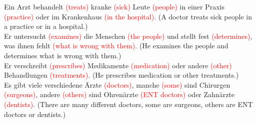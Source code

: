 \documentclass{article}
\begin{document}
\begin{enumerate}
    Ein Arzt behandelt \textcolor{red}{(treats)} kranke \textcolor{red}{(sick)} Leute \textcolor{red}{(people)} in einer Praxis \textcolor{red}{(practice)} oder im Krankenhaus \textcolor{red}{(in the hospital)}. (A doctor treats sick people in a practice or in a hospital.) \\
    Er untersucht \textcolor{red}{(examines)} die Menschen \textcolor{red}{(the people)} und stellt fest \textcolor{red}{(determines)}, was ihnen fehlt \textcolor{red}{(what is wrong with them)}. (He examines the people and determines what is wrong with them.) \\
    Er verschreibt \textcolor{red}{(prescribes)} Medikamente \textcolor{red}{(medication)} oder andere \textcolor{red}{(other)} Behandlungen \textcolor{red}{(treatments)}. (He prescribes medication or other treatments.) \\
    Es gibt viele verschiedene Ärzte \textcolor{red}{(doctors)}, manche \textcolor{red}{(some)} sind Chirurgen \textcolor{red}{(surgeons)}, andere \textcolor{red}{(others)} sind Ohrenärzte \textcolor{red}{(ENT doctors)} oder Zahnärzte \textcolor{red}{(dentists)}. (There are many different doctors, some are surgeons, others are ENT doctors or dentists.)


\end{enumerate}
\end{document}
